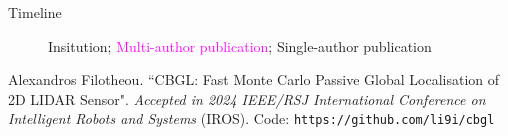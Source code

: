 \begin{frame}{Timeline}

\begin{figure}[t!] \centering
        
        \caption{\textcolor[RGB]{32,74,135}{Insitution}; \textcolor{magenta}{Multi-author publication}; \textcolor[RGB]{78,154,0}{Single-author publication}}
\end{figure}

\placebottom \tiny
\textcolor[RGB]{78,154,0}{Alexandros Filotheou. ``CBGL: Fast Monte Carlo Passive Global Localisation of 2D LIDAR Sensor". \textit{Accepted in 2024 IEEE/RSJ International Conference on Intelligent Robots and Systems}
(IROS)}. Code: \texttt{https://github.com/li9i/cbgl}

\end{frame}
